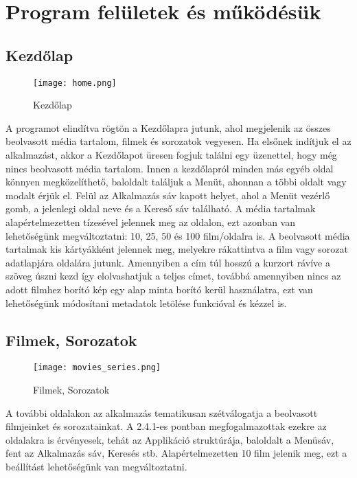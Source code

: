\section{Program felületek és működésük}

\subsection{Kezdőlap}
\begin{figure}[H]
	\centering
	\texttt{[image: home.png]}
	\caption{Kezdőlap}
	\label{fig:home}
\end{figure}
A programot elindítva rögtön a Kezdőlapra jutunk, ahol megjelenik az összes beolvasott média tartalom, filmek és sorozatok vegyesen. Ha elsőnek indítjuk el az alkalmazást, akkor a Kezdőlapot üresen fogjuk találni egy üzenettel, hogy még nincs beolvasott média tartalom. Innen a kezdőlapról minden más egyéb oldal könnyen megközelíthető, baloldalt találjuk a Menüt, ahonnan a többi oldalt vagy modalt érjük el. Felül az Alkalmazás sáv kapott helyet, ahol a Menüt vezérlő gomb, a jelenlegi oldal neve és a Kereső sáv található. A média tartalmak alapértelmezetten tízesével jelennek meg az oldalon, ezt azonban van lehetőségünk megváltoztatni: 10, 25, 50 és 100 film/oldalra is. A beolvasott média tartalmak kis kártyákként jelennek meg, melyekre rákattintva a film vagy sorozat adatlapjára oldalára jutunk. Amennyiben a cím túl hosszú a kurzort rávíve a szöveg úszni kezd így elolvashatjuk a teljes címet, továbbá amennyiben nincs az adott filmhez borító kép egy alap minta borító kerül használatra, ezt van lehetőségünk módosítani metadatok letölése funkcióval és kézzel is.

\subsection{Filmek, Sorozatok}
\begin{figure}[H]
	\centering
	\texttt{[image: movies\_series.png]}
	\caption{Filmek, Sorozatok}
	\label{fig:movies_series}
\end{figure}
A további oldalakon az alkalmazás tematikusan szétválogatja a beolvasott filmjeinket és sorozatainkat. A 2.4.1-es pontban megfogalmazottak ezekre az oldalakra is érvényesek, tehát az Applikáció struktúrája, baloldalt a Menüsáv, fent az Alkalmazás sáv, Keresés stb. Alapértelmezetten 10 film jelenik meg, ezt a beállítást lehetőségünk van megváltoztatni.

